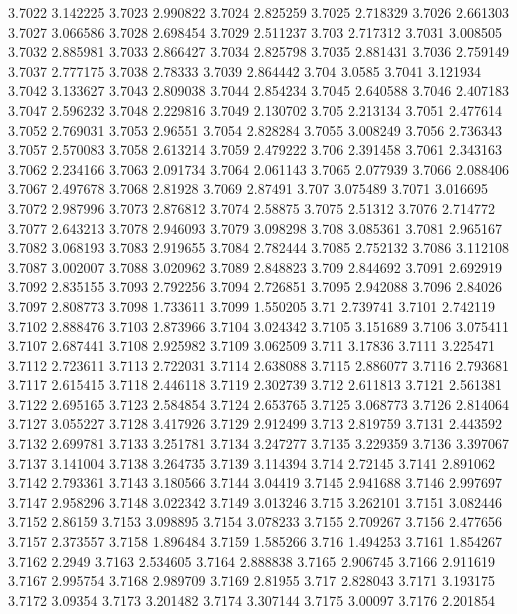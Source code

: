 3.7022  3.142225
3.7023  2.990822
3.7024  2.825259
3.7025  2.718329
3.7026  2.661303
3.7027  3.066586
3.7028  2.698454
3.7029  2.511237
3.703  2.717312
3.7031  3.008505
3.7032  2.885981
3.7033  2.866427
3.7034  2.825798
3.7035  2.881431
3.7036  2.759149
3.7037  2.777175
3.7038  2.78333
3.7039  2.864442
3.704  3.0585
3.7041  3.121934
3.7042  3.133627
3.7043  2.809038
3.7044  2.854234
3.7045  2.640588
3.7046  2.407183
3.7047  2.596232
3.7048  2.229816
3.7049  2.130702
3.705  2.213134
3.7051  2.477614
3.7052  2.769031
3.7053  2.96551
3.7054  2.828284
3.7055  3.008249
3.7056  2.736343
3.7057  2.570083
3.7058  2.613214
3.7059  2.479222
3.706  2.391458
3.7061  2.343163
3.7062  2.234166
3.7063  2.091734
3.7064  2.061143
3.7065  2.077939
3.7066  2.088406
3.7067  2.497678
3.7068  2.81928
3.7069  2.87491
3.707  3.075489
3.7071  3.016695
3.7072  2.987996
3.7073  2.876812
3.7074  2.58875
3.7075  2.51312
3.7076  2.714772
3.7077  2.643213
3.7078  2.946093
3.7079  3.098298
3.708  3.085361
3.7081  2.965167
3.7082  3.068193
3.7083  2.919655
3.7084  2.782444
3.7085  2.752132
3.7086  3.112108
3.7087  3.002007
3.7088  3.020962
3.7089  2.848823
3.709  2.844692
3.7091  2.692919
3.7092  2.835155
3.7093  2.792256
3.7094  2.726851
3.7095  2.942088
3.7096  2.84026
3.7097  2.808773
3.7098  1.733611
3.7099  1.550205
3.71  2.739741
3.7101  2.742119
3.7102  2.888476
3.7103  2.873966
3.7104  3.024342
3.7105  3.151689
3.7106  3.075411
3.7107  2.687441
3.7108  2.925982
3.7109  3.062509
3.711  3.17836
3.7111  3.225471
3.7112  2.723611
3.7113  2.722031
3.7114  2.638088
3.7115  2.886077
3.7116  2.793681
3.7117  2.615415
3.7118  2.446118
3.7119  2.302739
3.712  2.611813
3.7121  2.561381
3.7122  2.695165
3.7123  2.584854
3.7124  2.653765
3.7125  3.068773
3.7126  2.814064
3.7127  3.055227
3.7128  3.417926
3.7129  2.912499
3.713  2.819759
3.7131  2.443592
3.7132  2.699781
3.7133  3.251781
3.7134  3.247277
3.7135  3.229359
3.7136  3.397067
3.7137  3.141004
3.7138  3.264735
3.7139  3.114394
3.714  2.72145
3.7141  2.891062
3.7142  2.793361
3.7143  3.180566
3.7144  3.04419
3.7145  2.941688
3.7146  2.997697
3.7147  2.958296
3.7148  3.022342
3.7149  3.013246
3.715  3.262101
3.7151  3.082446
3.7152  2.86159
3.7153  3.098895
3.7154  3.078233
3.7155  2.709267
3.7156  2.477656
3.7157  2.373557
3.7158  1.896484
3.7159  1.585266
3.716  1.494253
3.7161  1.854267
3.7162  2.2949
3.7163  2.534605
3.7164  2.888838
3.7165  2.906745
3.7166  2.911619
3.7167  2.995754
3.7168  2.989709
3.7169  2.81955
3.717  2.828043
3.7171  3.193175
3.7172  3.09354
3.7173  3.201482
3.7174  3.307144
3.7175  3.00097
3.7176  2.201854
